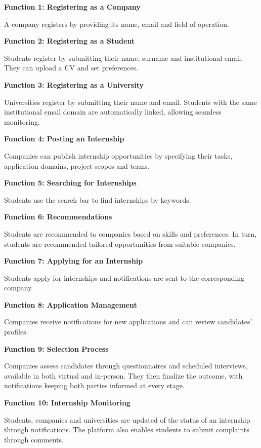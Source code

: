 \textbf{\textcolor{polimiblue}{Function 1: Registering as a Company}}

A company registers by providing its name, email and field of operation.

\textbf{\textcolor{polimiblue}{Function 2: Registering as a Student}}

Students register by submitting their name, surname and institutional email.
They can upload a CV and set preferences.

\textbf{\textcolor{polimiblue}{Function 3: Registering as a University}}

Universities register by submitting their name and email.
Students with the same institutional email domain are automatically linked, allowing seamless monitoring.

\textbf{\textcolor{polimiblue}{Function 4: Posting an Internship}}

Companies can publish internship opportunities by specifying their tasks, application domains, project scopes and terms.

\textbf{\textcolor{polimiblue}{Function 5: Searching for Internships}}

Students use the search bar to find internships by keywords. 

\textbf{\textcolor{polimiblue}{Function 6: Recommendations}}

Students are recommended to companies based on skills and preferences. In turn, students are recommended tailored opportunities from suitable companies.

\textbf{\textcolor{polimiblue}{Function 7: Applying for an Internship}}

Students apply for internships and notifications are sent to the corresponding company.

\textbf{\textcolor{polimiblue}{Function 8: Application Management}}

Companies receive notifications for new applications and can review candidates’ profiles.

\textbf{\textcolor{polimiblue}{Function 9: Selection Process}}

Companies assess candidates through questionnaires and scheduled interviews, available in both virtual and in-person.
They then finalize the outcome, with notifications keeping both parties informed at every stage.

\textbf{\textcolor{polimiblue}{Function 10: Internship Monitoring}}

Students, companies and universities are updated of the status of an internship through notifications.
The platform also enables students to submit complaints through comments.

